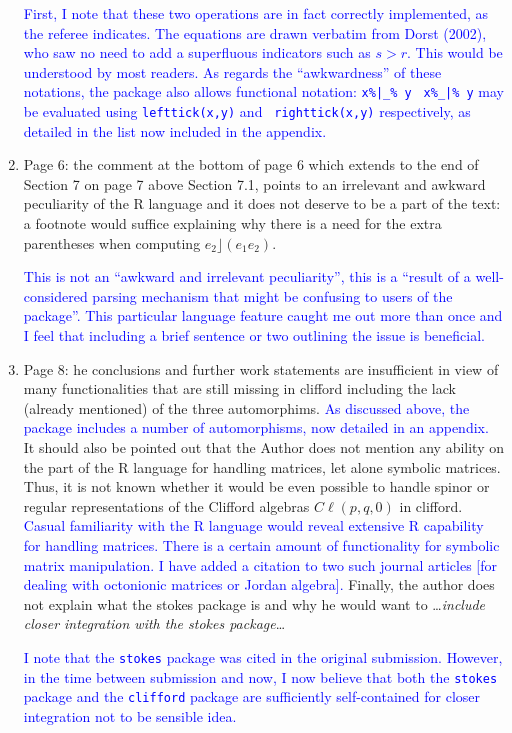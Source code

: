 \documentclass{article}
\newcommand{\cliff}[1]{\ensuremath{C\ell\left(#1\right)}}
\begin{document}
\begin{enumerate}
\textcolor{blue}{First, I note that these two operations are in fact
  correctly implemented, as the referee indicates.  The equations are
  drawn verbatim from Dorst (2002), who saw no need to add a
  superfluous indicators such as $s>r$. This would be understood by
  most readers.  As regards the ``awkwardness'' of these notations,
  the package also allows functional notation: {\tt x\%|\_\% y} {\tt
    x\%\_|\% y} may be evaluated using {\tt lefttick(x,y)} and {\tt
    righttick(x,y)} respectively, as detailed in the list now included
  in the appendix.}

\item Page 6: the comment at the bottom of page 6 which extends to the
  end of Section 7 on page 7 above Section 7.1, points to an
  irrelevant and awkward peculiarity of the R language and it does not
  deserve to be a part of the text: a footnote would suffice
  explaining why there is a need for the extra parentheses when
  computing $e_2\rfloor (e_1e_2)$.

  \textcolor{blue}{This is not an ``awkward and irrelevant
    peculiarity'', this is a ``result of a well-considered parsing
    mechanism that might be confusing to users of the package''.  This
    particular language feature caught me out more than once and I
    feel that including a brief sentence or two outlining the issue is
    beneficial.}


\item Page 8: he conclusions and further work statements are
  insufficient in view of many functionalities that are still missing
  in clifford including the lack (already mentioned) of the three
  automorphims. \textcolor{blue}{As discussed above, the package
    includes a number of automorphisms, now detailed in an appendix.}
  It should also be pointed out that the Author does not mention any
  ability on the part of the R language for handling matrices, let
  alone symbolic matrices.  Thus, it is not known whether it would be
  even possible to handle spinor or regular representations of the
  Clifford algebras \cliff{p, q, 0} in clifford.
  \textcolor{blue}{Casual familiarity with the R language would reveal
    extensive R capability for handling matrices.  There is a certain
    amount of functionality for symbolic matrix manipulation.  I have
    added a citation to two such journal articles [for dealing with
      octonionic matrices or Jordan algebra].}  Finally, the author
  does not explain what the stokes package is and why he would want to
  \ldots{\em include closer integration with the stokes package}\ldots

  \textcolor{blue}{I note that the {\tt stokes} package was cited in
    the original submission.  However, in the time between submission
    and now, I now believe that both the {\tt stokes} package and the
    {\tt clifford} package are sufficiently self-contained for closer
    integration not to be sensible idea.}


\end{enumerate}
\end{document}
